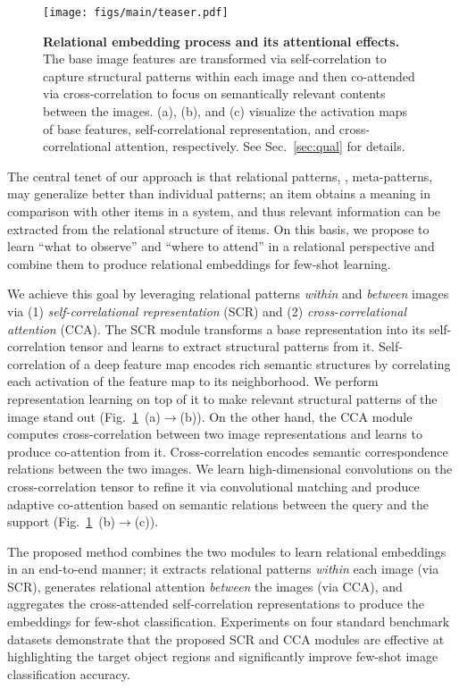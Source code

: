 \documentclass[10pt,twocolumn,letterpaper]{article}
\begin{document}
\begin{figure}[t!]
	\centering
	\small
    \texttt{[image: figs/main/teaser.pdf]}
	\caption{
    \textbf{Relational embedding process and its attentional effects.} 
    The base image features are transformed via self-correlation to capture structural patterns within each image and then co-attended via cross-correlation to focus on semantically relevant contents between the images.
    (a), (b), and (c) visualize the activation maps of base features, self-correlational representation, and cross-correlational attention, respectively. See Sec.~\ref{sec:qual} for details. 
	}
\label{fig:teaser}
\vspace{-4mm}
\end{figure}

The central tenet of our approach is that relational patterns, \ie, meta-patterns, may generalize better than individual patterns; an item obtains a meaning in comparison with  other items in a system, and thus relevant information can be extracted from the relational structure of items. On this basis, we propose to learn ``what to observe'' and ``where to attend'' in a relational perspective and combine them to produce relational embeddings for few-shot learning.

We achieve this goal by leveraging relational patterns {\em within} and {\em between} images via (1) {\em self-correlational representation} (SCR) and (2) {\em cross-correlational attention} (CCA).
The SCR module transforms a base representation into its self-correlation tensor and learns to extract structural patterns from it. 
Self-correlation of a deep feature map encodes rich semantic structures by correlating each activation of the feature map to its neighborhood. We perform representation learning on top of it to make relevant structural patterns of the image stand out (Fig.~\ref{fig:teaser}~(a)$\rightarrow$(b)).
On the other hand, the CCA module computes cross-correlation between two image representations and learns to produce co-attention from it. 
Cross-correlation encodes semantic correspondence relations between the two images. 
We learn high-dimensional convolutions on the cross-correlation tensor to refine it via convolutional matching and produce adaptive co-attention based on semantic relations between the query and the support (Fig.~\ref{fig:teaser}~(b)$\rightarrow$(c)).


The proposed method combines the two modules to learn relational embeddings in an end-to-end manner; it extracts relational patterns {\em within} each image (via SCR), generates relational attention {\em between} the images (via CCA), and aggregates the cross-attended self-correlation representations to produce the embeddings for few-shot classification.
Experiments on four standard benchmark datasets demonstrate that the proposed SCR and CCA modules are effective at highlighting the target object regions and significantly improve few-shot image classification accuracy.
\end{document}
